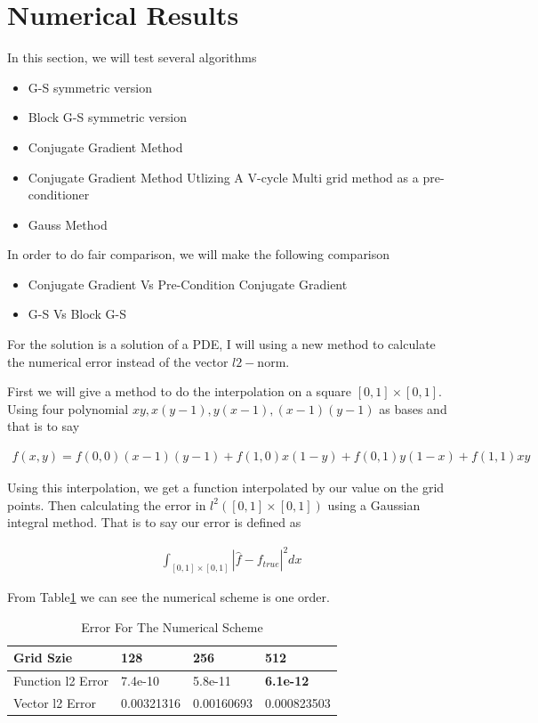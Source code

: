 \documentclass[12pt]{amsart}
\begin{document}
\section{Numerical Results}

In this section, we will test several algorithms
\begin{itemize}
	\item G-S symmetric version
	\item Block G-S symmetric version
	\item Conjugate Gradient Method
	\item Conjugate Gradient Method Utlizing A V-cycle Multi grid method as a pre-conditioner
	\item Gauss Method
\end{itemize}

In order to do fair comparison, we will make the following comparison

\begin{itemize}
	\item Conjugate Gradient Vs Pre-Condition Conjugate Gradient
	\item G-S Vs Block G-S
\end{itemize}

For the solution is a solution of a PDE, I will using a new method to calculate the numerical error instead of the vector $l2-$norm.

First we will give a method to do the interpolation on a square $[0,1]\times[0,1]$. Using four polynomial $xy,x(y-1),y(x-1),(x-1)(y-1)$ as bases and that is to say

\begin{align*}
	f(x,y)=f(0,0)(x-1)(y-1)+f(1,0)x(1-y)+f(0,1)y(1-x)+f(1,1)xy
\end{align*}

Using this interpolation, we get a function interpolated by our value on the grid points. Then calculating the error in $l^2([0,1]\times[0,1])$ using a Gaussian integral method. That is to say our error is defined as

\begin{align*}
	\int_{[0,1]\times[0,1]} |\hat f-f_{true}|^2dx
\end{align*}

From Table\ref{numericalerror} we can see the numerical scheme is one order.

\begin{table}[h]
	\centering
	\caption{Error For The Numerical Scheme}
	\label{numericalerror}
	\begin{tabular}{llll}
		Grid Szie         & 128        & 256        & 512         \\
		\hline\hline
		Function l2 Error & 7.4e-10    & 5.8e-11    & \textbf{6.1e-12}     \\
		Vector l2 Error   & 0.00321316 & 0.00160693 & 0.000823503
	\end{tabular}
\end{table}
\end{document}
